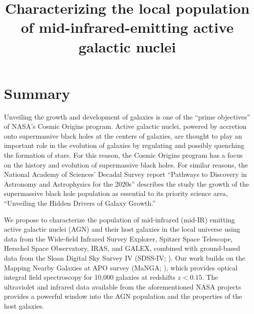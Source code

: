 \documentclass[12pt, preprint]{hacked-aastex}
\begin{document}
\pagestyle{plain}

\newcommand{\imtxt}[1]{\textcolor{red}{#1}}
\newcommand{\imsout}[1]{\textcolor{red}{\sout{#1}}}

\title{{\large Characterizing the local population of mid-infrared-emitting active galactic nuclei}}

\maketitle

\renewcommand{\baselinestretch}{0.75}\normalsize
{\hypersetup{hidelinks} \tableofcontents }
\renewcommand{\baselinestretch}{1.0}\normalsize


\newpage
\section{Summary}\label{sec:summary}

Unveiling the growth and development of galaxies is one of the ``prime
objectives'' of NASA's Cosmic Origins program.  Active galactic
nuclei, powered by accretion onto supermassive black holes at the
centers of galaxies, are thought to play an important role in the
evolution of galaxies by regulating and possibly quenching the
formation of stars.  For this reason, the Cosmic Origins program has a
focus on the history and evolution of supermassive black holes.  For
similar reasons, the National Academy of Sciences' Decadal Survey
report ``Pathways to Discovery in Astronomy and Astrophysics for the
2020s'' describes the study the growth of the supermassive black hole
population as essential to its priority science area, ``Unveiling the
Hidden Drivers of Galaxy Growth.''

We propose to characterize the population of mid-infrared (mid-IR)
emitting active galactic nuclei (AGN) and their host galaxies in the
local universe using data from the Wide-field Infrared Survey
Explorer, Spitzer Space Telescope, Herschel Space Observatory, IRAS,
and GALEX, combined with ground-based data from the Sloan Digital Sky
Survey IV (SDSS-IV; \cite{blanton17a}).  Our work builds on the
Mapping Nearby Galaxies at APO survey (MaNGA; \cite{bundy15a}), which
provides optical integral field spectroscopy for 10,000 galaxies at
redshifts $z<0.15$.  The ultraviolet and infrared data available from
the aforementioned NASA projects provides a powerful window into the
AGN population and the properties of the host galaxies.
\end{document}
